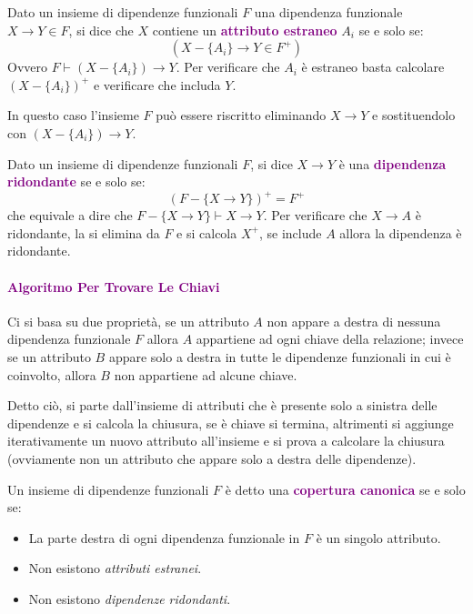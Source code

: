 \begin{definition}
    Dato un insieme di dipendenze funzionali $F$ una dipendenza funzionale
    $X \rightarrow Y \in F$, si dice che $X$ contiene un \textbf{\textcolor{purple}{attributo estraneo}}
    $A_i$ se e solo se:
    \begin{equation*}
        (X - \{A_i\} \rightarrow Y \in F^+)
    \end{equation*}
    Ovvero $F \vdash (X - \{A_i\}) \rightarrow Y$. Per verificare che $A_i$ è estraneo
    basta calcolare $(X - \{A_i\})^+$ e verificare che includa $Y$.

    In questo caso l'insieme $F$ può essere riscritto eliminando $X \rightarrow Y$ e sostituendolo
    con $(X - \{A_i\}) \rightarrow Y$.
\end{definition}

\begin{definition}
    Dato un insieme di dipendenze funzionali $F$, si dice $X \rightarrow Y$ è una \textbf{\textcolor{purple}{dipendenza ridondante}}
    se e solo se:
    \begin{equation*}
        (F - \{X \rightarrow Y\})^+ = F^+
    \end{equation*}
    che equivale a dire che $F - \{X \rightarrow Y\} \vdash X \rightarrow Y$. Per verificare che $X \rightarrow A$ è
    ridondante, la si elimina da $F$ e si calcola $X^+$, se include $A$ allora la dipendenza è ridondante.
\end{definition}

\paragraph{\textcolor{purple}{Algoritmo Per Trovare Le Chiavi}} Ci si basa su due proprietà, se un attributo $A$ non
appare a destra di nessuna dipendenza funzionale $F$ allora $A$ appartiene
ad ogni chiave della relazione; invece se un attributo $B$ appare solo a destra in tutte
le dipendenze funzionali in cui è coinvolto, allora $B$ non appartiene ad alcune chiave.

Detto ciò, si parte dall'insieme di attributi che è presente solo a sinistra delle dipendenze
e si calcola la chiusura, se è chiave si termina, altrimenti si aggiunge iterativamente un nuovo attributo
all'insieme e si prova a calcolare la chiusura (ovviamente non un attributo che appare solo a destra delle dipendenze).

\begin{definition}
    Un insieme di dipendenze funzionali $F$ è detto una \textbf{\textcolor{purple}{copertura canonica}} se e solo se:
    \begin{itemize}
        \item La parte destra di ogni dipendenza funzionale in $F$ è un singolo attributo.
        \item Non esistono \emph{attributi estranei}.
        \item Non esistono \emph{dipendenze ridondanti}.
    \end{itemize}
\end{definition}

